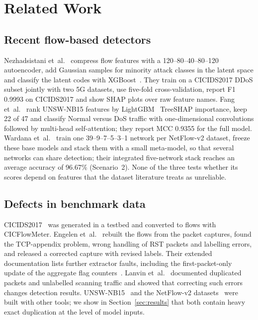 \documentclass[journal]{IEEEtran}
\begin{document}
\section{Related Work}
\label{sec:related}

\subsection{Recent flow-based detectors}
Nezhadsistani et~al.~\cite{nezhadsistani2026} compress flow features with a
120--80--40--80--120 autoencoder, add Gaussian samples for minority attack classes in the latent
space and classify the latent codes with XGBoost~\cite{chen2016}. They train on a CICIDS2017 DDoS
subset jointly with two 5G datasets, use five-fold cross-validation, report F1 0.9993 on
CICIDS2017 and show SHAP plots over raw feature names. Fang et~al.~\cite{fang2026} rank
UNSW-NB15 features by LightGBM~\cite{ke2017} TreeSHAP importance, keep 22 of 47 and classify
Normal versus DoS traffic with one-dimensional convolutions followed by multi-head
self-attention; they report MCC 0.9355 for the full model. Wardana et~al.~\cite{wardana2026} train one
39--9--7--5--3--1 network per NetFlow-v2 dataset, freeze these base models and stack them with a
small meta-model, so that several networks can share detection; their integrated five-network
stack reaches an average accuracy of 96.67\% (Scenario~2). None of the three tests whether its
scores depend on features that the dataset literature treats as unreliable.

\subsection{Defects in benchmark data}
CICIDS2017~\cite{sharafaldin2018} was generated in a testbed and converted to flows with
CICFlowMeter. Engelen et~al.~\cite{engelen2021} rebuilt the flows from the packet captures, found
the TCP-appendix problem, wrong handling of RST packets and labelling errors, and released a
corrected capture with revised labels. Their extended documentation lists further extractor
faults, including the first-packet-only update of the aggregate flag
counters~\cite{engelen2021ext}. Lanvin et~al.~\cite{lanvin2023} documented duplicated packets and
unlabelled scanning traffic and showed that correcting such errors changes detection results.
UNSW-NB15~\cite{moustafa2015} and the NetFlow-v2 datasets~\cite{sarhan2022} were built with other
tools; we show in Section~\ref{sec:results} that both contain heavy exact duplication at the level
of model inputs.
\end{document}

